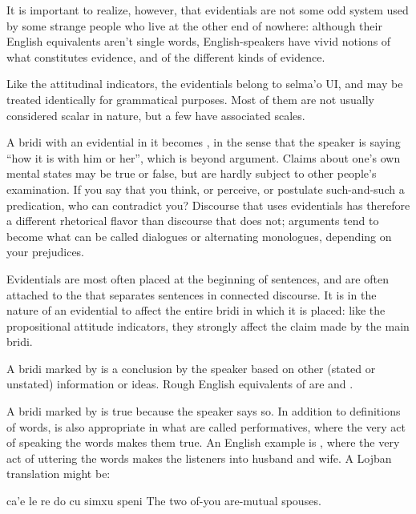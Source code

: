 It is important to realize, however, that evidentials are
    not some odd system used by some strange people who live at the
    other end of nowhere: although their English equivalents aren't
    single words, English-speakers have vivid notions of what
    constitutes evidence, and of the different kinds of
    evidence.

Like the attitudinal indicators, the evidentials belong to
    selma'o UI, and may be treated identically for grammatical
    purposes. Most of them are not usually considered scalar in
    nature, but a few have associated scales.

A bridi with an evidential in it becomes ,
    in the sense that the speaker is saying ``how it is with him or
    her'', which is beyond argument. Claims about one's own mental
    states may be true or false, but are hardly subject to other
    people's examination. If you say that you think, or perceive,
    or postulate such-and-such a predication, who can contradict
    you? Discourse that uses evidentials has therefore a different
    rhetorical flavor than discourse that does not; arguments tend
    to become what can be called dialogues or alternating
    monologues, depending on your prejudices.

Evidentials are most often placed at the beginning of
    sentences, and are often attached to the  that separates
    sentences in connected discourse. It is in the nature of an
    evidential to affect the entire bridi in which it is placed:
    like the propositional attitude indicators, they strongly
    affect the claim made by the main bridi.

A bridi marked by  is a conclusion by the speaker
    based on other (stated or unstated) information or ideas. Rough
    English equivalents of  are  and
    .

A bridi marked by  is true because the speaker says
    so. In addition to definitions of words,  is also
    appropriate in what are called performatives, where the very
    act of speaking the words makes them true. An English example
    is , where the very act
    of uttering the words makes the listeners into husband and
    wife. A Lojban translation might be:
\begin{example}
ca'e le re do cu simxu speni\n
{} The two of-you are-mutual spouses.
\end{example}

